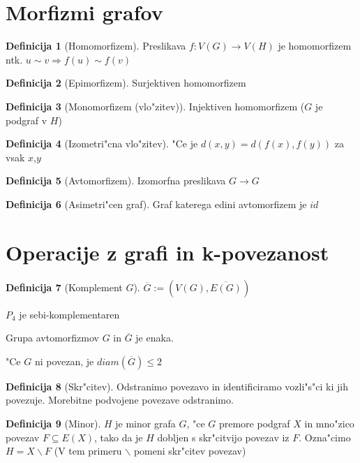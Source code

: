 \documentclass{article}
\theoremstyle{definition}
\newtheorem{definition}{Definicija}[section]
\begin{document}
	\section{Morfizmi grafov}
	
	\begin{definition}[Homomorfizem]
		Preslikava $f: V(G) \rightarrow V(H)$ je homomorfizem ntk. $u \sim v \Rightarrow f(u) \sim f(v)$
	\end{definition}
	\begin{definition}[Epimorfizem]
		Surjektiven homomorfizem 
	\end{definition}
	\begin{definition}[Monomorfizem (vlo"zitev)]
		Injektiven homomorfizem ($G$ je podgraf v $H$) 
	\end{definition}
	\begin{definition}[Izometri"cna vlo"zitev]
		"Ce je $d(x,y) = d(f(x), f(y))$ za vsak $x$,$y$
	\end{definition}
	\begin{definition}[Avtomorfizem]
		Izomorfna preslikava $G \rightarrow G$
	\end{definition}
	\begin{definition}[Asimetri"cen graf]
		Graf katerega edini avtomorfizem je $id$
	\end{definition}
	
	
	\section{Operacije z grafi in k-povezanost}	
	\begin{definition}[Komplement $G$]
		$\overline{G} := (V(G), \overline{E(G)})$
	\end{definition}
	$P_4$ je sebi-komplementaren
	
	Grupa avtomorfizmov $G$ in $\overline{G}$ je enaka.
	
	"Ce $G$ ni povezan, je $diam(\overline{G}) \leq 2$
	
	\begin{definition}[Skr"citev]
		Odstranimo povezavo in identificiramo vozli"s"ci ki jih povezuje.
		Morebitne podvojene povezave odstranimo.
	\end{definition} 
	
	\begin{definition}[Minor]
		$H$ je minor grafa $G$, "ce $G$ premore podgraf $X$ in mno"zico povezav $F \subseteq E(X)$, tako da je $H$ dobljen s skr"citvijo povezav iz $F$.
		Ozna"cimo $H = X \backslash F$ (V tem primeru $ \backslash $ pomeni skr"citev povezav)
	\end{definition} 
	
\end{document}
